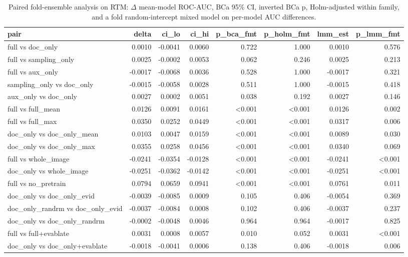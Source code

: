 \begin{table}[t]
\centering
\caption{Paired fold-ensemble analysis on RTM: $\Delta$ mean-model ROC-AUC, BCa 95\% CI, inverted BCa p, Holm-adjusted within family, and a fold random-intercept mixed model on per-model AUC differences.}
\label{tab:rtm_stats}
\begin{tabular}{lrrrrrrr}
\toprule
pair & delta & ci\_lo & ci\_hi & p\_bca\_fmt & p\_holm\_fmt & lmm\_est & p\_lmm\_fmt \\
\midrule
full vs doc\_only & 0.0010 & -0.0041 & 0.0060 & 0.722 & 1.000 & 0.0010 & 0.576 \\
full vs sampling\_only & 0.0025 & -0.0002 & 0.0053 & 0.062 & 0.246 & 0.0025 & 0.213 \\
full vs aux\_only & -0.0017 & -0.0068 & 0.0036 & 0.528 & 1.000 & -0.0017 & 0.321 \\
sampling\_only vs doc\_only & -0.0015 & -0.0058 & 0.0028 & 0.511 & 1.000 & -0.0015 & 0.418 \\
aux\_only vs doc\_only & 0.0027 & 0.0002 & 0.0051 & 0.038 & 0.192 & 0.0027 & 0.146 \\
full vs full\_mean & 0.0126 & 0.0091 & 0.0161 & <0.001 & <0.001 & 0.0126 & 0.002 \\
full vs full\_max & 0.0350 & 0.0252 & 0.0449 & <0.001 & <0.001 & 0.0317 & 0.006 \\
doc\_only vs doc\_only\_mean & 0.0103 & 0.0047 & 0.0159 & <0.001 & <0.001 & 0.0089 & 0.030 \\
doc\_only vs doc\_only\_max & 0.0355 & 0.0258 & 0.0456 & <0.001 & <0.001 & 0.0340 & 0.069 \\
full vs whole\_image & -0.0241 & -0.0354 & -0.0128 & <0.001 & <0.001 & -0.0241 & <0.001 \\
doc\_only vs whole\_image & -0.0251 & -0.0362 & -0.0142 & <0.001 & <0.001 & -0.0251 & <0.001 \\
full vs no\_pretrain & 0.0794 & 0.0659 & 0.0941 & <0.001 & <0.001 & 0.0761 & 0.011 \\
doc\_only vs doc\_only\_evid & -0.0039 & -0.0085 & 0.0009 & 0.105 & 0.406 & -0.0054 & 0.369 \\
doc\_only\_randrm vs doc\_only\_evid & -0.0037 & -0.0084 & 0.0008 & 0.102 & 0.406 & -0.0037 & 0.237 \\
doc\_only vs doc\_only\_randrm & -0.0002 & -0.0048 & 0.0046 & 0.964 & 0.964 & -0.0017 & 0.825 \\
full vs full+evablate & 0.0031 & 0.0008 & 0.0057 & 0.010 & 0.052 & 0.0031 & <0.001 \\
doc\_only vs doc\_only+evablate & -0.0018 & -0.0041 & 0.0006 & 0.138 & 0.406 & -0.0018 & 0.006 \\
\bottomrule
\end{tabular}
\end{table}